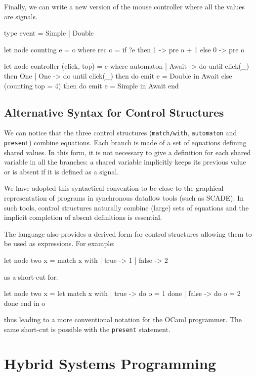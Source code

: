 \documentclass[11pt,titlepage,twoside]{report}
\newcommand{\scade}{{\sf SCADE}}
\newcommand{\ocaml}{{\sf OCaml}}
\begin{document}
Finally, we can write a new version of the mouse controller where all
the values are signals.
\begin{chklisting}[withresult]
type event = Simple | Double

let node counting e = o where
  rec o = if ?e then 1 -> pre o + 1 else 0 -> pre o

let node controller (click, top) = e where
  automaton
  | Await ->
     do until click(_) then One
  | One ->
     do until click(_) then do emit e = Double in Await
     else (counting top = 4) then do emit e = Simple in Await
  end
\end{chklisting}

\section{Alternative Syntax for Control Structures\label{altcontrol}} %

We can notice that the three control structures (\verb+match/with+,
\verb-automaton- and \verb-present-) combine equations. Each branch is
made of a set of equations defining shared values. In this form, it
is not necessary to give a definition for each shared variable in all the
branches: a shared variable implicitly keeps its previous value or
is absent if it is defined as a signal.

We have adopted this syntactical convention to be close to the graphical
representation of programs in synchronous dataflow tools (such as
\scade). In such tools, control structures naturally combine (large) sets of
equations and the implicit completion of absent definitions is
essential.

The language also provides a derived form for control structures
allowing them to be used as expressions. For example:
%
\begin{chklisting}
let node two x =
  match x with | true -> 1 | false -> 2
\end{chklisting}
%
as a short-cut for:
\begin{chklisting}
let node two x =
  let match x with
     |  true -> do o = 1 done
     | false -> do o = 2 done
     end in
  o
\end{chklisting}
%
thus leading to a more conventional notation for the \ocaml{}
programmer. The same short-cut is possible with the \verb-present- statement.



\chapter{Hybrid Systems Programming\label{ode-programming}} %
\end{document}
